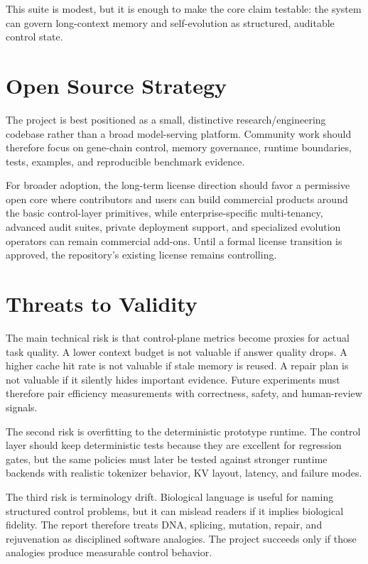 \documentclass[10pt]{article}
\begin{document}
This suite is modest, but it is enough to make the core claim testable: the
system can govern long-context memory and self-evolution as structured,
auditable control state.

\section{Open Source Strategy}

The project is best positioned as a small, distinctive research/engineering
codebase rather than a broad model-serving platform. Community work should
therefore focus on gene-chain control, memory governance, runtime boundaries,
tests, examples, and reproducible benchmark evidence.

For broader adoption, the long-term license direction should favor a permissive
open core where contributors and users can build commercial products around the
basic control-layer primitives, while enterprise-specific multi-tenancy,
advanced audit suites, private deployment support, and specialized evolution
operators can remain commercial add-ons. Until a formal license transition is
approved, the repository's existing license remains controlling.

\section{Threats to Validity}

The main technical risk is that control-plane metrics become proxies for actual
task quality. A lower context budget is not valuable if answer quality drops. A
higher cache hit rate is not valuable if stale memory is reused. A repair plan
is not valuable if it silently hides important evidence. Future experiments
must therefore pair efficiency measurements with correctness, safety, and
human-review signals.

The second risk is overfitting to the deterministic prototype runtime. The
control layer should keep deterministic tests because they are excellent for
regression gates, but the same policies must later be tested against stronger
runtime backends with realistic tokenizer behavior, KV layout, latency, and
failure modes.

The third risk is terminology drift. Biological language is useful for naming
structured control problems, but it can mislead readers if it implies biological
fidelity. The report therefore treats DNA, splicing, mutation, repair, and
rejuvenation as disciplined software analogies. The project succeeds only if
those analogies produce measurable control behavior.
\end{document}
